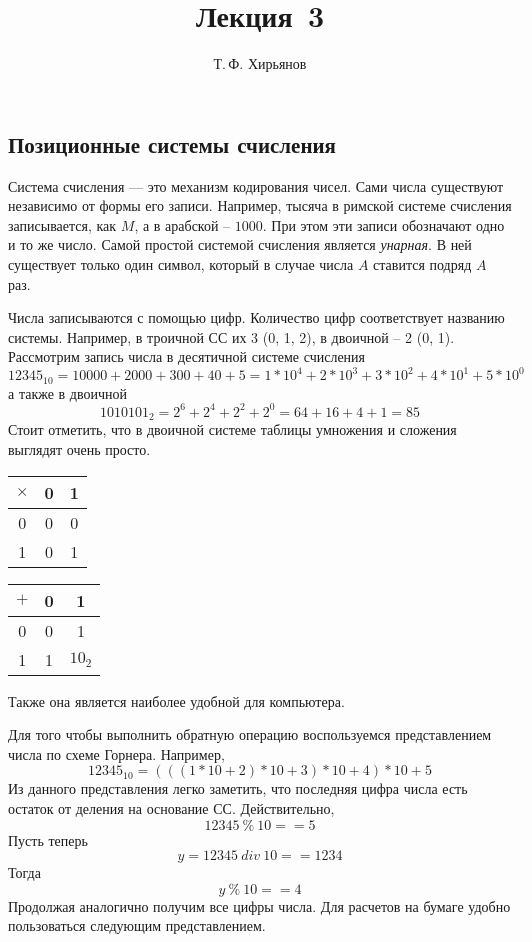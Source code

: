 \documentclass[a4paper, fleqn]{article}
\title{Лекция \textnumero\,3}
\author{Т.\,Ф. Хирьянов}
\date{}
\begin{document}
	\maketitle
	
	\subsection*{Позиционные системы счисления}
	
	Система счисления --- это механизм кодирования чисел. Сами числа существуют независимо от формы его записи. 
	Например, тысяча в римской системе счисления записывается, как $M$, а в арабской -- $1000$. При этом эти записи обозначают одно и то же число. 
	Самой простой системой счисления является \emph{унарная}.
	В ней существует только один символ, который в случае числа $A$ ставится подряд $A$ раз.
	
	Числа записываются с помощью цифр. Количество цифр соответствует названию системы. Например, в троичной СС их 3 (0, 1, 2), в двоичной -- 2 (0, 1).
	Рассмотрим запись числа в  десятичной системе счисления 
	\[12345_{10} = 10000+2000+300+40+5 = 1*10^{4} + 2*10^3+3*10^2 + 4*10^1 + 5*10^0\]
	а также в двоичной
	\[1010101_2 = 2^6+2^4+2^2+2^0 = 64+16+4+1 = 85\]
	Стоит отметить, что в двоичной системе таблицы умножения и сложения выглядят очень просто.  
	\begin{tabular}{c|cc}
		$\times$ & 0 & 1 \\
		\hline
		0 & 0 & 0 \\
		1 & 0 & 1
	\end{tabular}\qquad
	\begin{tabular}{c|cc}
		$+$ & 0 & 1 \\
		\hline
		0 & 0 & 1 \\
		1 & 1 & $10_2$
	\end{tabular}
	
	Также она является  наиболее удобной для компьютера.
	
	Для того чтобы выполнить обратную операцию воспользуемся представлением числа по схеме Горнера. Например, 
	\[12345_{10}= (((1*10+2)*10+3)*10+4)*10+5\] 
	Из данного представления легко заметить, что последняя цифра числа есть остаток от деления на основание СС. Действительно, 
	\[12345~\%~10 == 5\]
	Пусть теперь 
	\[y = 12345~div~10 == 1234\]
	Тогда 
	\[y~\%~10 == 4\]
	Продолжая аналогично получим все цифры числа. Для расчетов на бумаге удобно пользоваться следующим представлением. 
		
\end{document}
